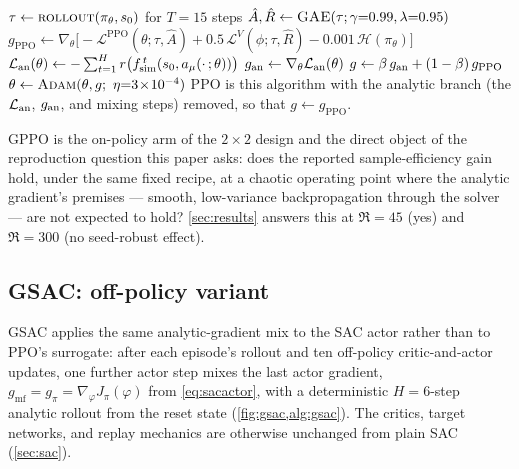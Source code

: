 \begin{algorithm}[t]
\caption{GPPO --- one training episode ($\beta=0.5$, $H=6$)}
\label{alg:gppo}
\DontPrintSemicolon
{}
$\tau \leftarrow \textsc{rollout}(\pi_\theta, s_0)$ for $T=15$ steps
$\hat A,\hat R \leftarrow \textsc{GAE}(\tau;\gamma{=}0.99,\lambda{=}0.95)$\;
$g_{\mathrm{PPO}} \leftarrow \nabla_\theta\big[-\mathcal{L}^{\mathrm{PPO}}(\theta;\tau,\hat A)+0.5\,\mathcal{L}^{V}(\phi;\tau,\hat R)-0.001\,\mathcal{H}(\pi_\theta)\big]$\;
$\mathcal{L}_{\mathrm{an}}(\theta) \leftarrow -\sum_{t=1}^{H} r\big(f_{\mathrm{sim}}^{\,t}(s_0,a_\mu(\cdot\,;\theta))\big)$\;
$g_{\mathrm{an}} \leftarrow \nabla_\theta \mathcal{L}_{\mathrm{an}}(\theta)$ 
$g \leftarrow \beta\,g_{\mathrm{an}} + (1-\beta)\,g_{\mathrm{PPO}}$\;
$\theta \leftarrow \textproc{Adam}(\theta, g;\ \eta{=}3\!\times\!10^{-4})$ 
PPO is this algorithm with the analytic branch (the $\mathcal{L}_{\mathrm{an}}$, $g_{\mathrm{an}}$, and mixing steps) removed, so that $g \leftarrow g_{\mathrm{PPO}}$.
\end{algorithm}

GPPO is the on-policy arm of the $2\times 2$
design and the direct object of the reproduction question this paper asks:
does the reported sample-efficiency gain hold, under the same fixed recipe,
at a chaotic operating point where the analytic gradient's premises ---
smooth, low-variance backpropagation through the solver --- are not
expected to hold? \cref{sec:results} answers this at $\Re=45$ (yes) and
$\Re=300$ (no seed-robust effect).

\subsection{GSAC: off-policy variant}
\label{sec:gsac}

GSAC applies the same analytic-gradient mix to the SAC actor rather than to
PPO's surrogate: after each episode's rollout and ten off-policy
critic-and-actor updates, one further actor step mixes the last actor
gradient, $g_{\mathrm{mf}}=g_\pi=\nabla_\varphi J_\pi(\varphi)$ from
\cref{eq:sacactor}, with a deterministic $H=6$-step analytic rollout from
the reset state (\cref{fig:gsac,alg:gsac}). The critics, target networks,
and replay mechanics are otherwise unchanged from plain SAC (\cref{sec:sac}).

